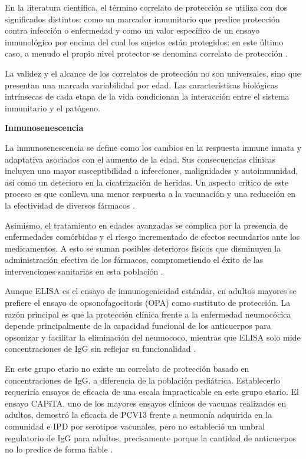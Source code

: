 En la literatura científica, el término correlato de protección se utiliza con dos significados distintos: como un marcador inmunitario que predice protección contra infección o enfermedad y como un valor específico de un ensayo inmunológico por encima del cual los sujetos están protegidos: en este último caso, a menudo el propio nivel protector se denomina correlato de protección \cite{nauta2020}.

La validez y el alcance de los correlatos de protección no son universales, sino que presentan una marcada variabilidad por edad. Las características biológicas intrínsecas de cada etapa de la vida condicionan la interacción entre el sistema inmunitario y el patógeno.

\vspace{\baselineskip}
\textbf{Inmunosenescencia}
\vspace{\baselineskip}

La inmunosenescencia se define como los cambios en la respuesta inmune innata y adaptativa asociados con el aumento de la edad. Sus consecuencias clínicas incluyen una mayor susceptibilidad a infecciones, malignidades y autoinmunidad, así como un deterioro en la cicatrización de heridas. Un aspecto crítico de este proceso es que conlleva una menor respuesta a la vacunación y una reducción en la efectividad de diversos fármacos \cite{busse2010}.

Asimismo, el tratamiento en edades avanzadas se complica por la presencia de enfermedades comórbidas y el riesgo incrementado de efectos secundarios ante los medicamentos. A esto se suman posibles deterioros físicos que disminuyen la administración efectiva de los fármacos, comprometiendo el éxito de las intervenciones sanitarias en esta población \cite{busse2010}.

Aunque ELISA es el ensayo de inmunogenicidad estándar, en adultos mayores se prefiere el ensayo de opsonofagocitosis (OPA) como sustituto de protección. La razón principal es que la protección clínica frente a la enfermedad neumocócica depende principalmente de la capacidad funcional de los anticuerpos para opsonizar y facilitar la eliminación del neumococo, mientras que ELISA solo mide concentraciones de IgG sin reflejar su funcionalidad \cite{Westerink2012}.

En este grupo etario no existe un correlato de protección basado en concentraciones de IgG, a diferencia de la población pediátrica. Establecerlo requeriría ensayos de eficacia de una escala impracticable en este grupo etario. El ensayo CAPiTA, uno de los mayores ensayos clínicos de vacunas realizados en adultos, demostró la eficacia de PCV13 frente a neumonía adquirida en la comunidad e IPD por serotipos vacunales, pero no estableció un umbral regulatorio de IgG para adultos, precisamente porque la cantidad de anticuerpos no lo predice de forma fiable \cite{Theilacker2022}.

